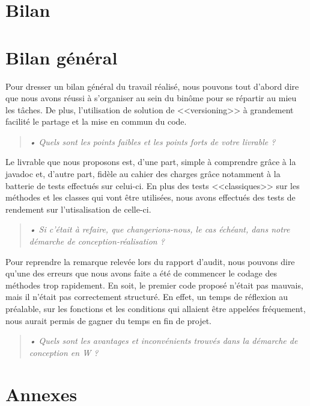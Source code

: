 \documentclass[12pt,a4paper]{report}
\begin{document}
\chapter*{Bilan}
\label{chapter:Bilan} %


\chapter*{Bilan général}
\label{chapter:Bilan général} %
Pour dresser un bilan général du travail réalisé, nous pouvons tout d'abord dire que nous avons réussi à s'organiser au sein du binôme pour se répartir au mieu les tâches. De plus, l'utilisation de solution de <<versioning>> à grandement facilité le partage et la mise en commun du code.
\begin{quotation}
\textit{• Quels sont les points faibles et les points forts de votre livrable ?}
\end{quotation}

Le livrable que nous proposons est, d'une part, simple à comprendre grâce à la javadoc et, d'autre part, fidèle au cahier des charges grâce notamment à la batterie de tests effectués sur celui-ci. En plus des tests <<classiques>> sur les méthodes et les classes qui vont être utilisées, nous avons effectués des tests de rendement sur l'utisalisation de celle-ci. 

\begin{quotation}
\textit{• Si c'était à refaire, que changerions-nous, le cas échéant, dans notre démarche de conception-réalisation ?}
\end{quotation}

Pour reprendre la remarque relevée lors du rapport d'audit, nous pouvons dire qu'une des erreurs que nous avons faite a été de commencer le codage des méthodes trop rapidement. En soit, le premier code proposé n'était pas mauvais, mais il n'était pas correctement structuré. En effet, un temps de réflexion au préalable, sur les fonctions et les conditions qui allaient être appelées fréquement, nous aurait permis de gagner du temps en fin de projet. 

\begin{quotation}
\textit{• Quels sont les avantages et inconvénients trouvés dans la démarche de conception en W ?}
\end{quotation}


\chapter*{Annexes}
\label{chapter:Annexes} %
\end{document}
